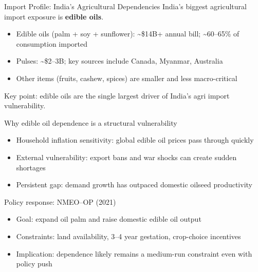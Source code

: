 \documentclass[
  ignorenonframetext,
  aspectratio=169,
]{beamer}
\makeatletter
\providecommand{\tightlist}{%
  \setlength{\itemsep}{0pt}\setlength{\parskip}{0pt}}
\let\quarto@originallabel\label
\DeclareRobustCommand*{\label}[1]{\quarto@originallabel{#1}}
\makeatother
\begin{document}
\begin{frame}
\begin{block}{Import Profile: India's Agricultural Dependencies}
\label{import-profile-indias-agricultural-dependencies}
India's biggest agricultural import exposure is \textbf{edible oils}.

\begin{itemize}
\tightlist
\item
  Edible oils (palm + soy + sunflower): \textasciitilde\$14B+ annual
  bill; \textasciitilde60--65\% of consumption imported
\item
  Pulses: \textasciitilde\$2--3B; key sources include Canada, Myanmar,
  Australia
\item
  Other items (fruits, cashew, spices) are smaller and less
  macro-critical
\end{itemize}

Key point: edible oils are the single largest driver of India's agri
import vulnerability.

\end{block}
\end{frame}

\begin{frame}
\begin{block}{Why edible oil dependence is a structural vulnerability}
\label{why-edible-oil-dependence-is-a-structural-vulnerability}
\begin{itemize}
\tightlist
\item
  Household inflation sensitivity: global edible oil prices pass through
  quickly
\item
  External vulnerability: export bans and war shocks can create sudden
  shortages
\item
  Persistent gap: demand growth has outpaced domestic oilseed
  productivity
\end{itemize}
\end{block}
\end{frame}

\begin{frame}
\begin{block}{Policy response: NMEO--OP (2021)}
\label{policy-response-nmeoop-2021}
\begin{itemize}
\tightlist
\item
  Goal: expand oil palm and raise domestic edible oil output
\item
  Constraints: land availability, 3--4 year gestation, crop-choice
  incentives
\item
  Implication: dependence likely remains a medium-run constraint even
  with policy push
\end{itemize}
\end{block}
\end{frame}
\end{document}
